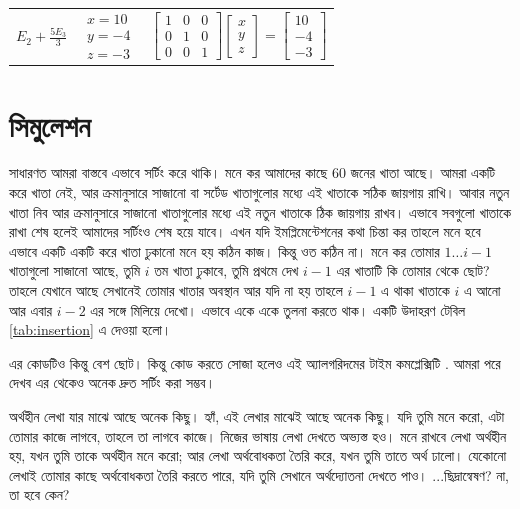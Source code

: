 \begin{center}
\begin{longtable}{|c|c|c|}
\hline
$E_2 + \frac{5E_3}{3}$ & $\begin{array}{c} x = 10 \\ y = -4 \\ z = -3  \end{array}$ & $\left[\begin{array}{ccc} 1 & 0 & 0 \\ 0 & 1 & 0 \\ 0 & 0 & 1 \end{array}\right] \left[ \begin{array}{c} x \\ y \\ z \end{array}\right] = \left[ \begin{array}{c} 10 \\ -4 \\ -3 \end{array}\right]$\\[20pt]
\end{longtable}
\end{center}


\section{সিমুলেশন}

সাধারণত আমরা বাস্তবে এভাবে সর্টিং করে থাকি। মনে কর আমাদের কাছে $60$ জনের খাতা আছে। আমরা একটি করে খাতা নেই, আর ক্রমানুসারে সাজানো বা সর্টেড খাতাগুলোর মধ্যে এই খাতাকে সঠিক জায়গায় রাখি। আবার নতুন খাতা নিব আর ক্রমানুসারে সাজানো খাতাগুলোর মধ্যে এই নতুন খাতাকে ঠিক জায়গায় রাখব। এভাবে সবগুলো খাতাকে রাখা শেষ হলেই আমাদের সর্টিংও শেষ হয়ে যাবে। এখন যদি ইমপ্লিমেন্টেশনের কথা চিন্তা কর তাহলে মনে হবে এভাবে একটি একটি করে খাতা ঢুকানো মনে হয় কঠিন কাজ। কিন্তু ওত কঠিন না। মনে কর তোমার $1 \ldots i-1$ খাতাগুলো সাজানো আছে, তুমি $i$ তম খাতা ঢুকাবে, তুমি প্রথমে দেখ $i-1$ এর খাতাটি কি তোমার থেকে ছোট? তাহলে যেখানে আছে সেখানেই তোমার খাতার অবস্থান আর যদি না হয় তাহলে $i-1$ এ থাকা খাতাকে $i$ এ আনো আর এবার $i-2$ এর সঙ্গে মিলিয়ে দেখো। এভাবে একে একে তুলনা করতে থাক। একটি উদাহরণ টেবিল \ref{tab:insertion} এ দেওয়া হলো।

এর কোডটিও কিন্তু বেশ ছোট। কিন্তু কোড করতে সোজা হলেও এই অ্যালগরিদমের টাইম কমপ্লেক্সিটি . আমরা পরে দেখব এর থেকেও অনেক দ্রুত সর্টিং করা সম্ভব।

অর্থহীন লেখা যার মাঝে আছে অনেক কিছু। হ্যাঁ, এই লেখার মাঝেই আছে অনেক কিছু। যদি তুমি মনে করো, এটা তোমার কাজে লাগবে, তাহলে তা লাগবে কাজে। নিজের ভাষায় লেখা দেখতে অভ্যস্ত হও। মনে রাখবে লেখা অর্থহীন হয়, যখন তুমি তাকে অর্থহীন মনে করো; আর লেখা অর্থবোধকতা তৈরি করে, যখন তুমি তাতে অর্থ ঢালো। যেকোনো লেখাই তোমার কাছে অর্থবোধকতা তৈরি করতে পারে, যদি তুমি সেখানে অর্থদ্যোতনা দেখতে পাও। ...ছিদ্রান্বেষণ? না, তা হবে কেন?

